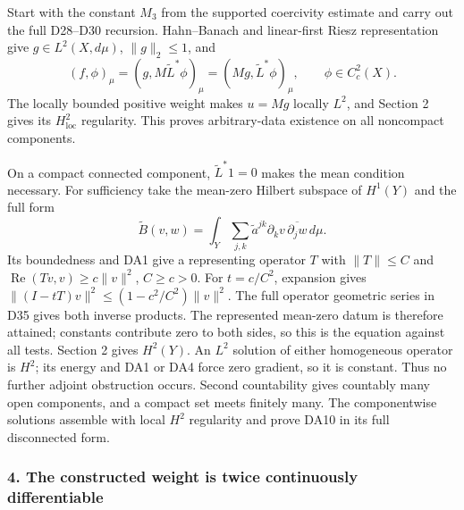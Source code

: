 \documentclass[
  11pt,
]{article}
\begin{document}
Start with the constant \(M_3\) from the supported coercivity estimate
and carry out the full D28--D30 recursion. Hahn--Banach and linear-first
Riesz representation give \(g\in L^2(X,d\mu)\), \(\|g\|_2\leq1\), and \[
 (f,\phi)_\mu=(g,M\widetilde L^*\phi)_\mu
             =(Mg,\widetilde L^*\phi)_\mu,
 \qquad \phi\in C_c^2(X).\tag{DA11}
\] The locally bounded positive weight makes \(u=Mg\) locally \(L^2\),
and Section 2 gives its \(H^2_{\mathrm{loc}}\) regularity. This proves
arbitrary-data existence on all noncompact components.

On a compact connected component, \(\widetilde L^*1=0\) makes the mean
condition necessary. For sufficiency take the mean-zero Hilbert subspace
of \(H^1(Y)\) and the full form \[
 \widetilde B(v,w)=\int_Y\sum_{j,k}\widetilde a^{jk}\partial_kv\,
                                     \overline{\partial_jw}\,d\mu.
 \tag{DA12}
\] Its boundedness and DA1 give a representing operator \(T\) with
\(\|T\|\leq C\) and \(\operatorname{Re}(Tv,v)\geq c\|v\|^2\),
\(C\geq c>0\). For \(t=c/C^2\), expansion gives
\(\|(I-tT)v\|^2\leq(1-c^2/C^2)\|v\|^2\). The full operator geometric
series in D35 gives both inverse products. The represented mean-zero
datum is therefore attained; constants contribute zero to both sides, so
this is the equation against all tests. Section 2 gives \(H^2(Y)\). An
\(L^2\) solution of either homogeneous operator is \(H^2\); its energy
and DA1 or DA4 force zero gradient, so it is constant. Thus no further
adjoint obstruction occurs. Second countability gives countably many
open components, and a compact set meets finitely many. The
componentwise solutions assemble with local \(H^2\) regularity and prove
DA10 in its full disconnected form.

\subsubsection{4. The constructed weight is twice continuously
differentiable}\label{the-constructed-weight-is-twice-continuously-differentiable}
\end{document}
